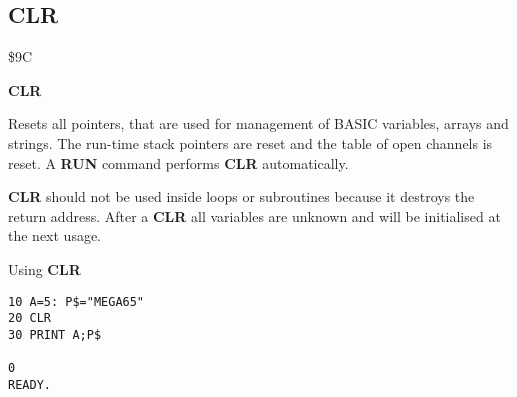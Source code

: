 \subsection{CLR}
\begin{description}[leftmargin=2cm,style=nextline]
\item [Token:] \$9C
\item [Format:] {\bf CLR}
\item [Usage:] Resets all pointers, that
               are used for management of BASIC variables, arrays
               and strings. The run-time stack pointers are reset
               and the table of open channels is reset.
               A {\bf RUN} command performs {\bf CLR} automatically.

\item [Remarks:] {\bf CLR} should not be used inside loops or
               subroutines because it destroys the return address.
               After a {\bf CLR} all variables are unknown and will
               be initialised at the next usage.

\item [Example:] Using {\bf CLR}
\begin{tcolorbox}[colback=black,coltext=white]
\verbatimfont{\codefont}
\begin{verbatim}
10 A=5: P$="MEGA65"
20 CLR
30 PRINT A;P$

0
READY.
\end{verbatim}
\end{tcolorbox}
\end{description}


\newpage
